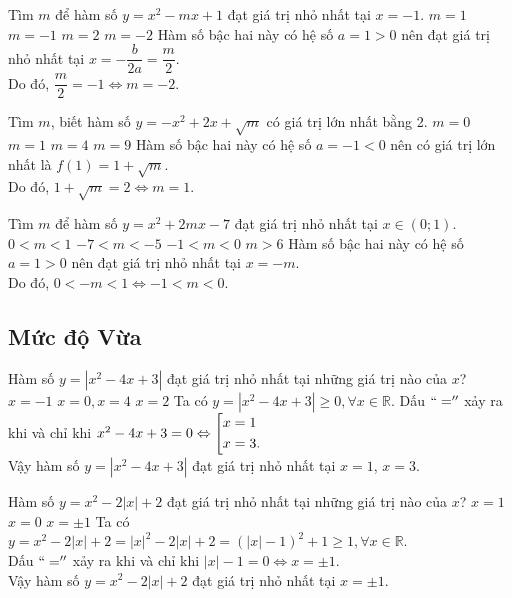 \begin{ex}%
	Tìm $m$ để hàm số $y=x^2-mx+1$ đạt giá trị nhỏ nhất tại $x=-1$.
	\choice
	{$m=1$}
	{$m=-1$}
	{$m=2$}
	{\True $m=-2$} 
	\loigiai
	{
		Hàm số bậc hai này có hệ số $a=1>0$ nên đạt giá trị nhỏ nhất tại $x=-\dfrac{b}{2a}=\dfrac{m}{2}$.\\
		Do đó, $\dfrac{m}{2}=-1\Leftrightarrow m=-2$.
	}
\end{ex}

\begin{ex}%
	Tìm $m$, biết hàm số $y=-x^2+2x+\sqrt{m}$ có giá trị lớn nhất bằng 2. 
	\choice
	{$m=0$}
	{\True$m=1$}
	{$m=4$}
	{$m=9$} 
	\loigiai
	{
		Hàm số bậc hai này có hệ số $a=-1<0$ nên có giá trị lớn nhất là $f(1)=1+\sqrt{m}$.\\
		Do đó, $1+\sqrt{m}=2\Leftrightarrow m=1$.
	}
\end{ex}

\begin{ex}%
	Tìm $m$ để  hàm số $y=x^2+2mx-7$ đạt giá trị nhỏ nhất tại $x\in(0;1)$.
	\choice
	{$0<m<1$}
	{$-7<m<-5$}
	{\True $-1<m<0$}
	{$m>6$} 
	\loigiai
	{
		Hàm số bậc hai này có hệ số $a=1>0$ nên đạt giá trị nhỏ nhất tại $x=-m$.\\
		Do đó, $0<-m<1\Leftrightarrow -1<m<0$.
	}
\end{ex}







\subsection*{Mức độ Vừa}
\begin{ex}%
	Hàm số $y=|x^2-4x+3|$ đạt giá trị nhỏ nhất tại những giá trị nào của $x$?
	{$x=-1$}
	{$x=0,x=4$}
	{$x=2$}
	\loigiai
	{
		Ta có $y=|x^2-4x+3|\ge 0,\forall x\in \mathbb{R}$. Dấu $``=''$ xảy ra khi và chỉ khi $x^2-4x+3=0\Leftrightarrow \left[\begin{aligned}&x=1\\&x=3.\end{aligned}\right.$\\
		Vậy hàm số $y=|x^2-4x+3|$ đạt giá trị nhỏ nhất tại $x=1$, $x=3$.
	}
\end{ex}
\begin{ex}%
	Hàm số $y=x^2-2|x|+2$ đạt giá trị nhỏ nhất tại những giá trị nào của $x$?
	{$x=1$}
	{$x=0$}
	{\True $x=\pm 1$}
	\loigiai
	{
		Ta có $y=x^2-2|x|+2=|x|^2-2|x|+2=\left(|x|-1\right)^2+1\ge 1,\forall x\in\mathbb{R}$.\\ Dấu $``=''$ xảy ra khi và chỉ khi $|x|-1=0\Leftrightarrow x=\pm 1.$\\
		Vậy hàm số $y=x^2-2|x|+2$ đạt giá trị nhỏ nhất tại $x=\pm 1$.
	}
\end{ex}

